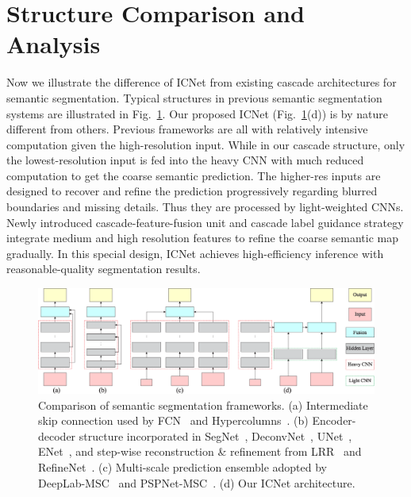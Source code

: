 \documentclass[runningheads]{llncs}
\begin{document}
\section{Structure Comparison and Analysis}
Now we illustrate the difference of ICNet from existing cascade architectures for semantic segmentation. Typical structures in previous semantic segmentation systems are illustrated in Fig.~\ref{fig:diffstructure}. Our proposed ICNet (Fig.~\ref{fig:diffstructure}(d)) is by nature different from others. Previous frameworks are all with relatively intensive computation given the high-resolution input. While in our cascade structure, only the lowest-resolution input is fed into the heavy CNN with much reduced computation to get the coarse semantic prediction. The higher-res inputs are designed to recover and refine the prediction progressively regarding blurred boundaries and missing details. Thus they are processed by light-weighted CNNs. Newly introduced cascade-feature-fusion unit and cascade label guidance strategy integrate medium and high resolution features to refine the coarse semantic map gradually. In this special design, ICNet achieves high-efficiency inference with reasonable-quality segmentation results. 

\begin{figure}[t]
	\begin{center}
		\includegraphics[width=1.0\linewidth]{figure/diffstructure.eps}
	\end{center}
	\caption{Comparison of semantic segmentation frameworks. (a) Intermediate skip connection used by FCN~\cite{long2015fully} and Hypercolumns~\cite{hariharan2015hypercolumns}. (b) Encoder-decoder structure incorporated in SegNet~\cite{badrinarayanan2015segnet}, DeconvNet~\cite{noh2015learning}, UNet~\cite{ronneberger2015unet}, ENet~\cite{paszke2016enet}, and step-wise reconstruction \& refinement from LRR~\cite{ghiasi2016laplacian} and RefineNet~\cite{lin2017refine}. (c) Multi-scale prediction ensemble adopted by DeepLab-MSC~\cite{chen2015semantic} and PSPNet-MSC~\cite{zhao2017pspnet}. (d) Our ICNet architecture.}
	\label{fig:diffstructure}
\end{figure}
\end{document}
